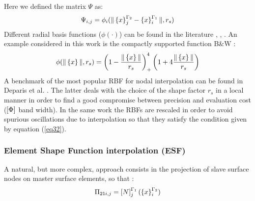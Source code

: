      Here we defined the matrix $\Psi$ as:
     \begin{equation}
     \label{eq.40}
       \Psi_ {i,j}=\phi_i(\|\left\lbrace{x}\right \rbrace^{\Gamma_2}_j-\left\lbrace{x}\right \rbrace^{\Gamma_1}_i\|,r_s)
     \end{equation}
     Different radial basis functions ($\phi(\cdot)$) can be found in the literature  \cite{wendland1995piecewise},\cite{buhmann2003radial} , \cite{duchon1977splines}.  An example considered in this work is the compactly supported function B\&W \cite{wendland1995piecewise}:
     \begin{equation}
     \label{eq.41}
     \phi(\|\left\lbrace{x}\right \rbrace\|,r_s)=\left(1-\frac{\|\left\lbrace{x}\right \rbrace\|}{r_s}\right)^4_+\left(1+4\frac{\|\left\lbrace{x}\right \rbrace\|}{r_s}\right)
     \end{equation}
     A benchmark of the most popular RBF for nodal interpolation can be found in Deparis et al. \cite{deparis2014rescaled}. The latter deals with the choice of the shape factor $r_s$ in a local manner in order to find a good compromise between precision and evaluation cost ($\left[{\Phi}\right]$ band width). In the same work the RBFs are rescaled in order to avoid spurious oscillations due to interpolation so that they satisfy the condition given by equation (\ref{eq32}). 
     \subsubsection{Element Shape Function interpolation (ESF)}\label{sssec333}
     A natural, but more complex, approach consists in the projection of slave surface nodes on master surface  elements, so that :
     \begin{equation}
     \label{eq.42}
         \Pi_{21i,j}=\left[{N}\right]_{j}^{\Gamma_1}(\left\lbrace{x}\right \rbrace_i^{\Gamma_2})
     \end{equation}
     
